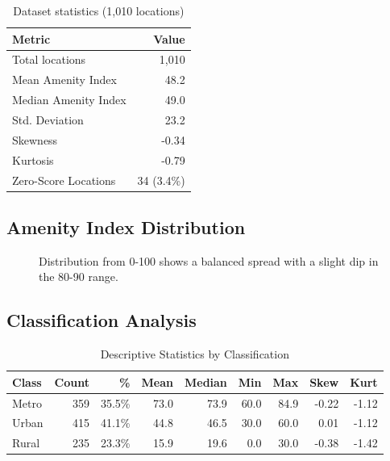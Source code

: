 \documentclass[11pt,a4paper]{article}
\begin{document}
\begin{table}[H]
\centering
\caption{Dataset statistics (1,010 locations)}
\begin{tabular}{@{}lr@{}}
\toprule
\textbf{Metric} & \textbf{Value} \\ \midrule
Total locations        & 1,010 \\
Mean Amenity Index     & 48.2 \\
Median Amenity Index   & 49.0 \\
Std. Deviation         & 23.2 \\
Skewness               & -0.34 \\
Kurtosis              & -0.79 \\
Zero-Score Locations   & 34 (3.4\%) \\ \bottomrule
\end{tabular}
\end{table}

\subsection{Amenity Index Distribution}

\begin{figure}[H]
\centering
{}
\caption{Distribution from 0-100 shows a balanced spread with a slight dip in the 80-90 range.}
\end{figure}

\subsection{Classification Analysis}

\begin{table}[H]
\centering
\caption{Descriptive Statistics by Classification}
\begin{tabular}{@{}lrrrrrrrr@{}}
\toprule
\textbf{Class} & \textbf{Count} & \textbf{\%} & \textbf{Mean} & \textbf{Median} & \textbf{Min} & \textbf{Max} & \textbf{Skew} & \textbf{Kurt} \\ \midrule
Metro & 359 & 35.5\% & 73.0 & 73.9 & 60.0 & 84.9 & -0.22 & -1.12 \\
Urban & 415 & 41.1\% & 44.8 & 46.5 & 30.0 & 60.0 & 0.01 & -1.12 \\
Rural & 235 & 23.3\% & 15.9 & 19.6 & 0.0 & 30.0 & -0.38 & -1.42 \\ \bottomrule
\end{tabular}
\end{table}
\end{document}
